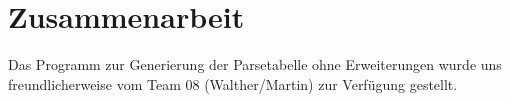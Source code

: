 \section{Zusammenarbeit}

Das Programm zur Generierung der Parsetabelle ohne Erweiterungen wurde uns freundlicherweise 
vom Team 08 (Walther/Martin) zur Verfügung gestellt.



